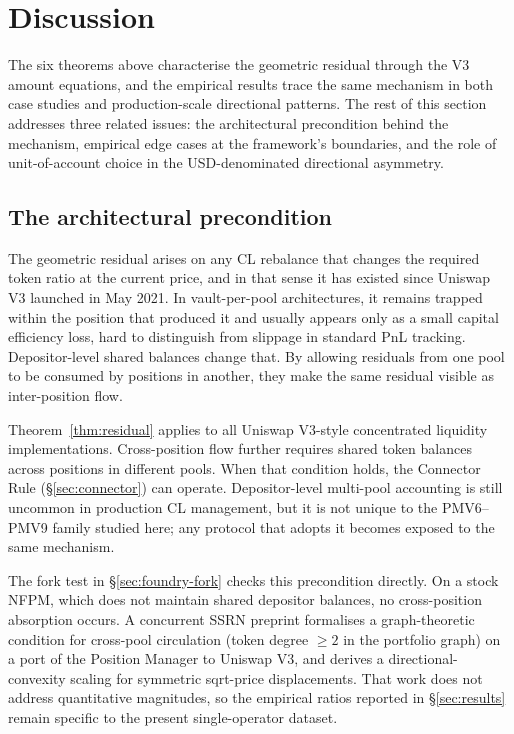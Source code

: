 \documentclass{manuscript}
\begin{document}
\section{Discussion}\label{sec:discussion}

The six theorems above characterise the geometric residual through the V3 amount equations, and the empirical results trace the same mechanism in both case studies and production-scale directional patterns. The rest of this section addresses three related issues: the architectural precondition behind the mechanism, empirical edge cases at the framework's boundaries, and the role of unit-of-account choice in the USD-denominated directional asymmetry.

\subsection{The architectural precondition}\label{sec:precondition}

The geometric residual arises on any CL rebalance that changes the required token ratio at the current price, and in that sense it has existed since Uniswap V3 launched in May 2021. In vault-per-pool architectures, it remains trapped within the position that produced it and usually appears only as a small capital efficiency loss, hard to distinguish from slippage in standard PnL tracking. Depositor-level shared balances change that. By allowing residuals from one pool to be consumed by positions in another, they make the same residual visible as inter-position flow.

Theorem~\ref{thm:residual} applies to all Uniswap V3-style concentrated liquidity implementations. Cross-position flow further requires shared token balances across positions in different pools. When that condition holds, the Connector Rule (\S\ref{sec:connector}) can operate. Depositor-level multi-pool accounting is still uncommon in production CL management, but it is not unique to the PMV6--PMV9 family studied here; any protocol that adopts it becomes exposed to the same mechanism.

The fork test in \S\ref{sec:foundry-fork} checks this precondition directly. On a stock NFPM, which does not maintain shared depositor balances, no cross-position absorption occurs. A concurrent SSRN preprint\cite{secondoperator2026} formalises a graph-theoretic condition for cross-pool circulation (token degree $\geq 2$ in the portfolio graph) on a port of the Position Manager to Uniswap V3, and derives a directional-convexity scaling for symmetric sqrt-price displacements. That work does not address quantitative magnitudes, so the empirical ratios reported in \S\ref{sec:results} remain specific to the present single-operator dataset.
\end{document}
